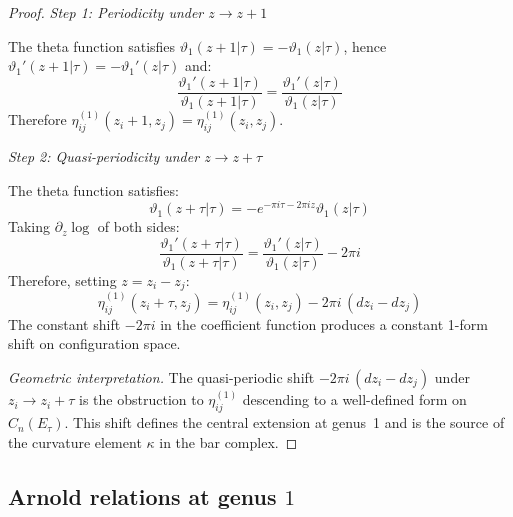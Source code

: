 \begin{proof}

\emph{Step 1: Periodicity under $z \to z + 1$}

The theta function satisfies $\vartheta_1(z + 1|\tau) = -\vartheta_1(z|\tau)$, hence $\vartheta_1'(z+1|\tau) = -\vartheta_1'(z|\tau)$ and:
\begin{equation}
\frac{\vartheta_1'(z+1|\tau)}{\vartheta_1(z+1|\tau)} = \frac{\vartheta_1'(z|\tau)}{\vartheta_1(z|\tau)}
\end{equation}
Therefore $\eta_{ij}^{(1)}(z_i + 1, z_j) = \eta_{ij}^{(1)}(z_i, z_j)$.

\emph{Step 2: Quasi-periodicity under $z \to z + \tau$}

The theta function satisfies:
\begin{equation}
\vartheta_1(z + \tau|\tau) = -e^{-\pi i \tau - 2\pi i z} \vartheta_1(z|\tau)
\end{equation}
Taking $\partial_z \log$ of both sides:
\begin{equation}
\frac{\vartheta_1'(z+\tau|\tau)}{\vartheta_1(z+\tau|\tau)} = \frac{\vartheta_1'(z|\tau)}{\vartheta_1(z|\tau)} - 2\pi i
\end{equation}
Therefore, setting $z = z_i - z_j$:
\begin{equation}
\eta_{ij}^{(1)}(z_i + \tau, z_j) = \eta_{ij}^{(1)}(z_i, z_j) - 2\pi i\,(dz_i - dz_j)
\end{equation}
The constant shift $-2\pi i$ in the coefficient function produces a constant 1-form shift on configuration space.

\emph{Geometric interpretation.} The quasi-periodic shift $-2\pi i\,(dz_i - dz_j)$ under $z_i \to z_i + \tau$ is the obstruction to $\eta_{ij}^{(1)}$ descending to a well-defined form on $C_n(E_\tau)$.  This shift defines the central extension at genus~1 and is the source of the curvature element $\kappa$ in the bar complex.
\end{proof}

\subsection{\texorpdfstring{Arnold relations at genus $1$}{Arnold relations at genus 1}}


